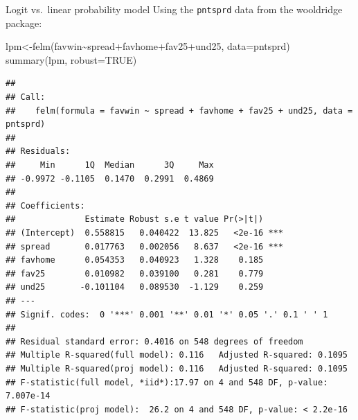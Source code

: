 \documentclass[
  ignorenonframetext,
]{beamer}
\newenvironment{Shaded}{\begin{snugshade}}{\end{snugshade}}
\newcommand{\AttributeTok}[1]{\textcolor[rgb]{0.77,0.63,0.00}{#1}}
\newcommand{\ConstantTok}[1]{\textcolor[rgb]{0.00,0.00,0.00}{#1}}
\newcommand{\FunctionTok}[1]{\textcolor[rgb]{0.00,0.00,0.00}{#1}}
\newcommand{\NormalTok}[1]{#1}
\newcommand{\OtherTok}[1]{\textcolor[rgb]{0.56,0.35,0.01}{#1}}
\newcommand{\SpecialCharTok}[1]{\textcolor[rgb]{0.00,0.00,0.00}{#1}}
\begin{document}
\begin{frame}[fragile]{Logit vs.~linear probability model}
\protect\hypertarget{logit-vs.-linear-probability-model}{}
Using the \texttt{pntsprd} data from the wooldridge package: \tiny

\begin{Shaded}
\begin{Highlighting}[]
\NormalTok{lpm}\OtherTok{\textless{}{-}}\FunctionTok{felm}\NormalTok{(favwin}\SpecialCharTok{\textasciitilde{}}\NormalTok{spread}\SpecialCharTok{+}\NormalTok{favhome}\SpecialCharTok{+}\NormalTok{fav25}\SpecialCharTok{+}\NormalTok{und25, }\AttributeTok{data=}\NormalTok{pntsprd)}
\FunctionTok{summary}\NormalTok{(lpm, }\AttributeTok{robust=}\ConstantTok{TRUE}\NormalTok{)}
\end{Highlighting}
\end{Shaded}

\begin{verbatim}
## 
## Call:
##    felm(formula = favwin ~ spread + favhome + fav25 + und25, data = pntsprd) 
## 
## Residuals:
##     Min      1Q  Median      3Q     Max 
## -0.9972 -0.1105  0.1470  0.2991  0.4869 
## 
## Coefficients:
##              Estimate Robust s.e t value Pr(>|t|)    
## (Intercept)  0.558815   0.040422  13.825   <2e-16 ***
## spread       0.017763   0.002056   8.637   <2e-16 ***
## favhome      0.054353   0.040923   1.328    0.185    
## fav25        0.010982   0.039100   0.281    0.779    
## und25       -0.101104   0.089530  -1.129    0.259    
## ---
## Signif. codes:  0 '***' 0.001 '**' 0.01 '*' 0.05 '.' 0.1 ' ' 1
## 
## Residual standard error: 0.4016 on 548 degrees of freedom
## Multiple R-squared(full model): 0.116   Adjusted R-squared: 0.1095 
## Multiple R-squared(proj model): 0.116   Adjusted R-squared: 0.1095 
## F-statistic(full model, *iid*):17.97 on 4 and 548 DF, p-value: 7.007e-14 
## F-statistic(proj model):  26.2 on 4 and 548 DF, p-value: < 2.2e-16
\end{verbatim}
\end{frame}
\end{document}
